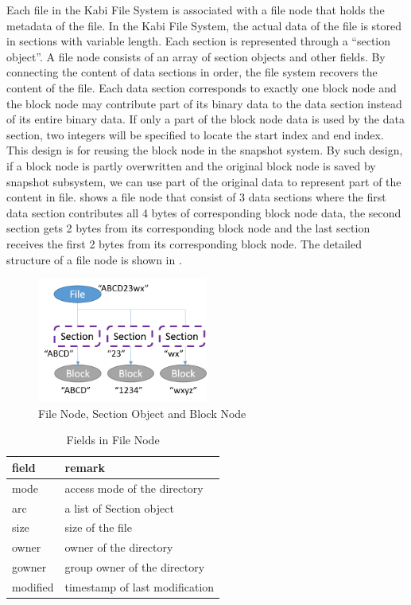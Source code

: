     Each file in the Kabi File System is associated with a file node that holds the metadata of the file. In the Kabi File System, the actual data of the file is stored in sections with variable length. Each section is represented through a ``section object''. A file node consists of an array of section objects and other fields. By connecting the content of data sections in order, the file system recovers the content of the file. Each data section corresponds to exactly one block node and the block node may contribute part of its binary data to the data section instead of its entire binary data. If only a part of the block node data is used by the data section, two integers will be specified to locate the start index and end index. This design is for reusing the block node in the snapshot system. By such design, if a block node is partly overwritten and the original block node is saved by snapshot subsystem, we can use part of the original data to represent part of the content in file.  shows a file node that consist of 3 data sections where the first data section contributes all 4 bytes of corresponding block node data, the second section gets 2 bytes from its corresponding block node and the last section receives the first 2 bytes from its corresponding block node. The detailed structure of a file node is shown in .

\begin{figure}[t]
\centering
\includegraphics[width=0.5\textwidth]{Chapter-3/figs/fig7.png}
\caption{File Node, Section Object and Block Node}
\label{fig:file_and_section}
\end{figure}


\begin{table}[t]
\begin{center}
\caption{Fields in File Node}
\begin{tabular}{ll}
\toprule
field & remark\\
\midrule
mode & access mode of the directory\\
arc & a list of Section object\\
size & size of the file\\
owner & owner of the directory\\
gowner & group owner of the directory\\
modified & timestamp of last modification\\
\bottomrule
\end{tabular}
\end{center}
\label{tab:file_fields}
\end{table}

